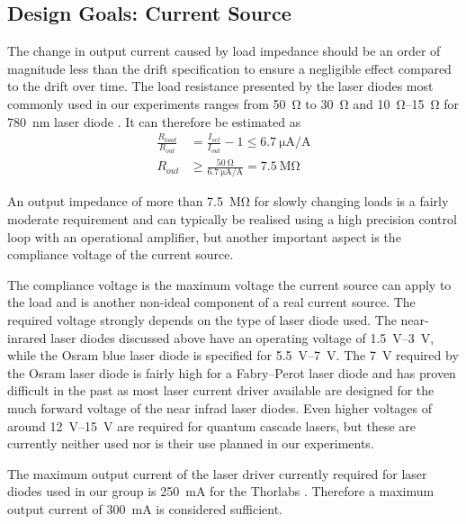 \subsection{Design Goals: Current Source}
The change in output current caused by load impedance should be an order of magnitude less than the drift specification to ensure a negligible effect compared to the drift over time. The load resistance presented by the laser diodes most commonly used in our experiments ranges from \qty{50}{\ohm} \cite{datasheet_osram_pl450b} to \qty{30}{\ohm} \cite{datasheet_adl_785} and \qtyrange{10}{15}{\ohm} for \qty{780}{\nm} laser diode \cite{datasheet_sharp_780nm,datasheet_thorlabs_780nm}. It can therefore be estimated as
\begin{align}
    \frac{R_{load}}{R_{out}} &= \frac{I_{set}}{I_{out}} - 1 \leq \qty[per-mode = symbol]{6.7}{\uA \per \A} \nonumber\\
    R_{out} &\geq \frac{\qty{50}{\ohm}}{\qty[per-mode = symbol]{6.7}{\uA \per \A}} = \qty{7.5}{\mega \ohm}
\end{align}

An output impedance of more than \qty{7.5}{\mega \ohm} for slowly changing loads is a fairly moderate requirement and can typically be realised using a high precision control loop with an operational amplifier, but another important aspect is the compliance voltage of the current source.

The compliance voltage is the maximum voltage the current source can apply to the load and is another non-ideal component of a real current source. The required voltage strongly depends on the type of laser diode used. The near-inrared laser diodes discussed above have an operating voltage of \qtyrange{1.5}{3}{\V}, while the Osram  blue laser diode is specified for \qtyrange{5.5}{7}{\V}. The \qty{7}{\V} required by the Osram laser diode is fairly high for a Fabry–Perot laser diode and has proven difficult in the past \cite{thesis_baus} as most laser current driver available are designed for the much forward voltage of the near infrad laser diodes. Even higher voltages of around \qtyrange{12}{15}{\V} are required for quantum cascade lasers, but these are currently neither used nor is their use planned in our experiments.

The maximum output current of the laser driver currently required for laser diodes used in our group is \qty{250}{\mA} for the Thorlabs  \cite{datasheet_thorlabs_780nm}. Therefore a maximum output current of \qty{300}{\mA} is considered sufficient.

